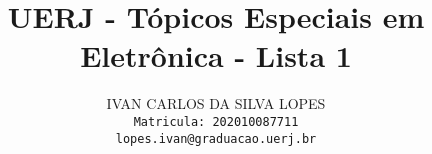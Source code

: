 \title
{UERJ - Tópicos Especiais em Eletrônica - Lista 1}

\author{IVAN CARLOS DA SILVA LOPES \\ %
	      \texttt{Matricula: 202010087711} \\
	      \texttt{lopes.ivan@graduacao.uerj.br}
}




